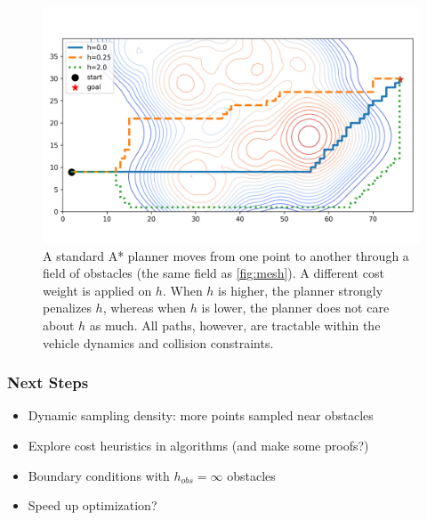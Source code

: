 \documentclass[10pt]{beamer}
\begin{document}
	\begin{frame}
		\begin{figure}
		\centering
		\includegraphics[width=.8\linewidth]{astar-2d.png}
		\caption[Different weights of $h$ in the A* planner.]{A standard A* planner moves from one point to another through a field of obstacles (the same field as \cref{fig:mesh}). A different cost weight is applied on $h$. When $h$ is higher, the planner strongly penalizes $h$, whereas when $h$ is lower, the planner does not care about $h$ as much. All paths, however, are tractable within the vehicle dynamics and collision constraints.}
		\label{fig:hcost}
		\end{figure}
	\end{frame}

	\begin{frame}
		\frametitle{Next Steps}
		\begin{itemize}
			\item Dynamic sampling density: more points sampled near obstacles
			\item Explore cost heuristics in algorithms (and make some proofs?)
			\item Boundary conditions with $h_{obs} = \infty$ obstacles
			\item Speed up optimization?
		\end{itemize}
	\end{frame}
\end{document}
